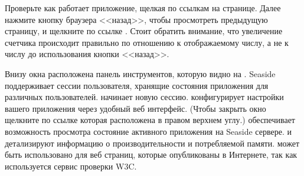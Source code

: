 \documentclass[a4paper,10pt,twoside]{book}
\begin{document}

\noindent
Проверьте как работает приложение, щелкая по ссылкам на странице.
Далее нажмите кнопку браузера <<назад>>,
чтобы просмотреть предыдущую страницу,
и щелкните по ссылке \link{++}.
Стоит обратить внимание,
что увеличение счетчика происходит правильно по отношению к
отображаемому числу, а не к числу до использования кнопки <<назад>>.


Внизу окна расположена панель инструментов,
которую видно на .
Seaside поддерживает сессии пользователя,
хранящие состояния приложения для различных пользователей.
 начинает новую сессию.
 конфигурирует настройки вашего приложения
через удобный веб интерфейс.
(Чтобы закрыть окно  щелкните по ссылке 
которая расположена в правом верхнем углу.)
 обеспечивает возможность просмотра
состояние активного приложения на Seaside сервере.
 и  детализируют информацию о
производительности и потребляемой памяти.
 может быть использовано для веб страниц, которые опубликованы в Интернете, так как используется сервис проверки W3C.
\end{document}
